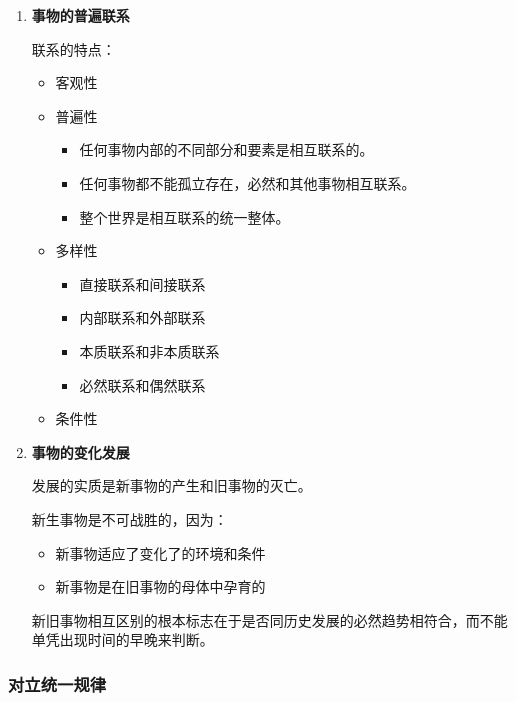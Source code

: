 \documentclass[12pt, a4paper, oneside]{ctexart}
\begin{document}
\begin{enumerate}
  \item {\bf 事物的普遍联系}
  
  联系的特点：
  \begin{itemize}
    \item 客观性
    \item 普遍性
    \begin{itemize}
      \item 任何事物内部的不同部分和要素是相互联系的。
      \item 任何事物都不能孤立存在，必然和其他事物相互联系。
      \item 整个世界是相互联系的统一整体。
    \end{itemize}
    \item 多样性
    \begin{itemize}
      \item 直接联系和间接联系
      \item 内部联系和外部联系
      \item 本质联系和非本质联系
      \item 必然联系和偶然联系
    \end{itemize}
    \item 条件性
  \end{itemize}

  \item {\bf 事物的变化发展}
  
  发展的实质是新事物的产生和旧事物的灭亡。

  新生事物是不可战胜的，因为：
  \begin{itemize}
    \item 新事物适应了变化了的环境和条件
    \item 新事物是在旧事物的母体中孕育的
  \end{itemize}

  新旧事物相互区别的根本标志在于是否同历史发展的必然趋势相符合，而不能单凭出现时间的早晚来判断。
\end{enumerate}

\subsubsection{对立统一规律}
\end{document}
